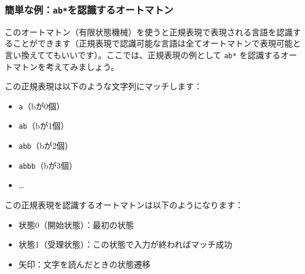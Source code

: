 \hypertarget{chapter4-ux7c21ux5358ux306aux4f8babux3092ux8a8dux8b58ux3059ux308bux30aaux30fcux30c8ux30deux30c8ux30f3}{%
\subsubsection{\texorpdfstring{簡単な例：\texttt{ab*}を認識するオートマトン}{簡単な例：ab*を認識するオートマトン}}\label{chapter4-ux7c21ux5358ux306aux4f8babux3092ux8a8dux8b58ux3059ux308bux30aaux30fcux30c8ux30deux30c8ux30f3}}

このオートマトン（有限状態機械）を使うと正規表現で表現される言語を認識することができます（正規表現で認識可能な言語は全てオートマトンで表現可能と言い換えててもいいです）。ここでは、正規表現の例として
\texttt{ab*} を認識するオートマトンを考えてみましょう。

この正規表現は以下のような文字列にマッチします：

\begin{itemize}
\tightlist
\item
  \texttt{a}（bが0個）
\item
  \texttt{ab}（bが1個）
\item
  \texttt{abb}（bが2個）
\item
  \texttt{abbb}（bが3個）
\item
  \ldots{}
\end{itemize}

この正規表現を認識するオートマトンは以下のようになります：

\begin{center}
\end{center}

\begin{itemize}
\tightlist
\item
  状態0（開始状態）：最初の状態
\item
  状態1（受理状態）：この状態で入力が終わればマッチ成功
\item
  矢印：文字を読んだときの状態遷移
\end{itemize}

